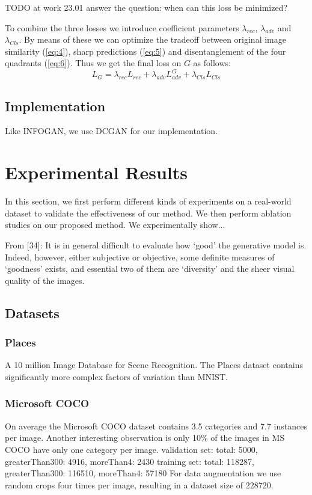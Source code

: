 \documentclass[11pt,a4paper]{article}
\begin{document}
TODO at work 23.01 answer the question: when can this loss be minimized?


To combine the three losses we introduce coefficient parameters $\lambda_{rec}$, $\lambda_{adv}$ and $\lambda_{Cls}$. By means of these we can optimize the tradeoff between original image similarity (\ref{eq:4}), sharp predictions (\ref{eq:5}) and disentanglement of the four quadrants (\ref{eq:6}). Thus we get the final loss on $G$ as follows:
\begin{equation} \label{eq:g_loss_comp}
    L_{G} = \lambda_{rec} L_{rec} + \lambda_{adv} L^G_{adv} + \lambda_{Cls} L_{Cls}
\end{equation}

\subsection{Implementation}
Like INFOGAN, we use DCGAN for our implementation.

\section{Experimental Results}
In this section, we first perform different kinds of experiments on a real-world dataset to validate the
effectiveness of our method. We then perform ablation studies on our proposed
method. 
We experimentally show...

From [34]: It is in general difficult to evaluate how ‘good’ the generative model is. Indeed, however, either subjective or objective, some definite measures of ‘goodness’ exists, and essential two of them are ‘diversity’ and the sheer visual quality of the images.
    
\subsection{Datasets}
\subsubsection{Places}
A 10 million Image Database for Scene Recognition. The Places dataset contains significantly more complex factors of variation than MNIST.

\subsubsection{Microsoft COCO}
On average the Microsoft COCO dataset \cite{1405.0312} contains 3.5 categories and 7.7 instances per image. Another interesting observation is only 10\% of the images in MS COCO have only one category per image.
validation set: total: 5000, greaterThan300: 4916, moreThan4: 2430
training set: total: 118287, greaterThan300: 116510, moreThan4: 57180
For data augmentation we use random crops four times per image, resulting in a dataset size of 228720.
    
\end{document}
